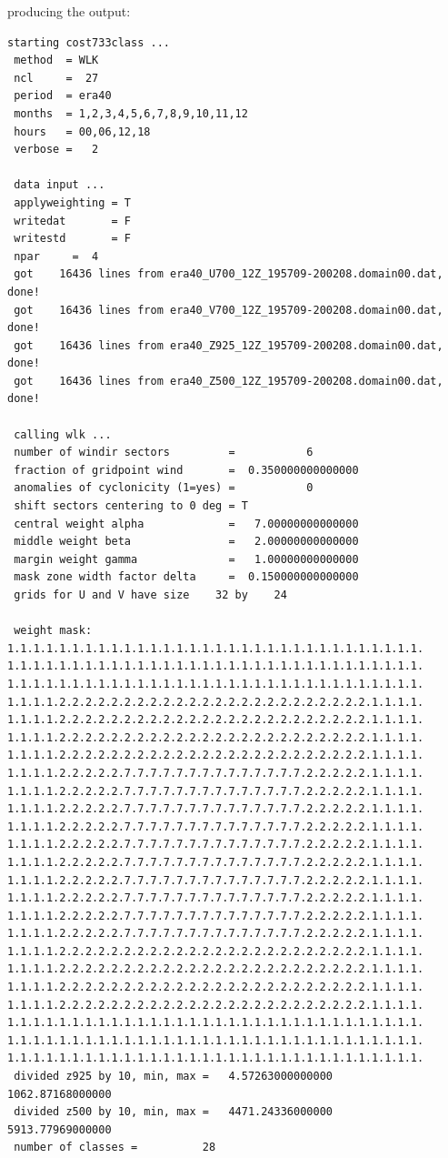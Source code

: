 \documentclass[12pt, oneside, a4paper, headsepline, plainheadsepline]{scrbook}
\begin{document}
producing the output:
\begin{scriptsize}
\begin{lstlisting}
starting cost733class ...
 method  = WLK
 ncl     =  27
 period  = era40
 months  = 1,2,3,4,5,6,7,8,9,10,11,12
 hours   = 00,06,12,18
 verbose =   2

 data input ...
 applyweighting = T
 writedat       = F
 writestd       = F
 npar     =  4
 got    16436 lines from era40_U700_12Z_195709-200208.domain00.dat, done!
 got    16436 lines from era40_V700_12Z_195709-200208.domain00.dat, done!
 got    16436 lines from era40_Z925_12Z_195709-200208.domain00.dat, done!
 got    16436 lines from era40_Z500_12Z_195709-200208.domain00.dat, done!

 calling wlk ...
 number of windir sectors         =           6
 fraction of gridpoint wind       =  0.350000000000000     
 anomalies of cyclonicity (1=yes) =           0
 shift sectors centering to 0 deg = T
 central weight alpha             =   7.00000000000000     
 middle weight beta               =   2.00000000000000     
 margin weight gamma              =   1.00000000000000     
 mask zone width factor delta     =  0.150000000000000     
 grids for U and V have size    32 by    24
 
 weight mask:
1.1.1.1.1.1.1.1.1.1.1.1.1.1.1.1.1.1.1.1.1.1.1.1.1.1.1.1.1.1.1.1.
1.1.1.1.1.1.1.1.1.1.1.1.1.1.1.1.1.1.1.1.1.1.1.1.1.1.1.1.1.1.1.1.
1.1.1.1.1.1.1.1.1.1.1.1.1.1.1.1.1.1.1.1.1.1.1.1.1.1.1.1.1.1.1.1.
1.1.1.1.2.2.2.2.2.2.2.2.2.2.2.2.2.2.2.2.2.2.2.2.2.2.2.2.1.1.1.1.
1.1.1.1.2.2.2.2.2.2.2.2.2.2.2.2.2.2.2.2.2.2.2.2.2.2.2.2.1.1.1.1.
1.1.1.1.2.2.2.2.2.2.2.2.2.2.2.2.2.2.2.2.2.2.2.2.2.2.2.2.1.1.1.1.
1.1.1.1.2.2.2.2.2.2.2.2.2.2.2.2.2.2.2.2.2.2.2.2.2.2.2.2.1.1.1.1.
1.1.1.1.2.2.2.2.2.7.7.7.7.7.7.7.7.7.7.7.7.7.7.2.2.2.2.2.1.1.1.1.
1.1.1.1.2.2.2.2.2.7.7.7.7.7.7.7.7.7.7.7.7.7.7.2.2.2.2.2.1.1.1.1.
1.1.1.1.2.2.2.2.2.7.7.7.7.7.7.7.7.7.7.7.7.7.7.2.2.2.2.2.1.1.1.1.
1.1.1.1.2.2.2.2.2.7.7.7.7.7.7.7.7.7.7.7.7.7.7.2.2.2.2.2.1.1.1.1.
1.1.1.1.2.2.2.2.2.7.7.7.7.7.7.7.7.7.7.7.7.7.7.2.2.2.2.2.1.1.1.1.
1.1.1.1.2.2.2.2.2.7.7.7.7.7.7.7.7.7.7.7.7.7.7.2.2.2.2.2.1.1.1.1.
1.1.1.1.2.2.2.2.2.7.7.7.7.7.7.7.7.7.7.7.7.7.7.2.2.2.2.2.1.1.1.1.
1.1.1.1.2.2.2.2.2.7.7.7.7.7.7.7.7.7.7.7.7.7.7.2.2.2.2.2.1.1.1.1.
1.1.1.1.2.2.2.2.2.7.7.7.7.7.7.7.7.7.7.7.7.7.7.2.2.2.2.2.1.1.1.1.
1.1.1.1.2.2.2.2.2.7.7.7.7.7.7.7.7.7.7.7.7.7.7.2.2.2.2.2.1.1.1.1.
1.1.1.1.2.2.2.2.2.2.2.2.2.2.2.2.2.2.2.2.2.2.2.2.2.2.2.2.1.1.1.1.
1.1.1.1.2.2.2.2.2.2.2.2.2.2.2.2.2.2.2.2.2.2.2.2.2.2.2.2.1.1.1.1.
1.1.1.1.2.2.2.2.2.2.2.2.2.2.2.2.2.2.2.2.2.2.2.2.2.2.2.2.1.1.1.1.
1.1.1.1.2.2.2.2.2.2.2.2.2.2.2.2.2.2.2.2.2.2.2.2.2.2.2.2.1.1.1.1.
1.1.1.1.1.1.1.1.1.1.1.1.1.1.1.1.1.1.1.1.1.1.1.1.1.1.1.1.1.1.1.1.
1.1.1.1.1.1.1.1.1.1.1.1.1.1.1.1.1.1.1.1.1.1.1.1.1.1.1.1.1.1.1.1.
1.1.1.1.1.1.1.1.1.1.1.1.1.1.1.1.1.1.1.1.1.1.1.1.1.1.1.1.1.1.1.1.
 divided z925 by 10, min, max =   4.57263000000000        1062.87168000000     
 divided z500 by 10, min, max =   4471.24336000000        5913.77969000000     
 number of classes =          28
 

\end{lstlisting}
\end{scriptsize}
\end{document}
